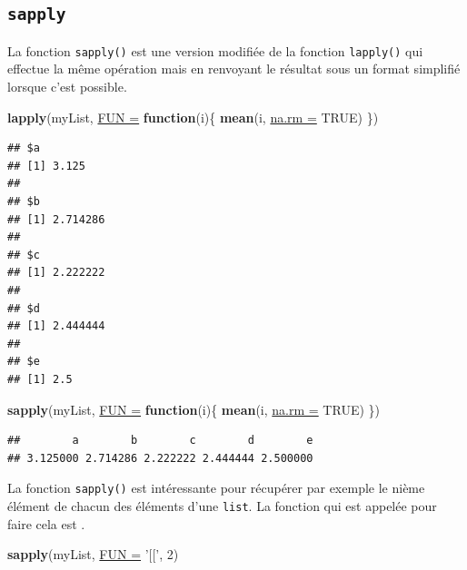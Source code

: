 \documentclass[twoside,symmetric]{book}
\newenvironment{Shaded}{}{}
\newcommand{\ControlFlowTok}[1]{\textbf{#1}}
\newcommand{\DataTypeTok}[1]{\underline{#1}}
\newcommand{\DecValTok}[1]{#1}
\newcommand{\KeywordTok}[1]{\textbf{#1}}
\newcommand{\NormalTok}[1]{#1}
\newcommand{\OtherTok}[1]{#1}
\newcommand{\StringTok}[1]{#1}
\begin{document}
\hypertarget{l17lapply}{%
\subsection{\texorpdfstring{\texttt{sapply}}{sapply}}\label{l17lapply}}

La fonction \texttt{sapply()} est une version modifiée de la fonction \texttt{lapply()} qui effectue la même opération mais en renvoyant le résultat sous un format simplifié lorsque c'est possible.

\begin{Shaded}
\begin{Highlighting}[]
\KeywordTok{lapply}\NormalTok{(myList, }\DataTypeTok{FUN =} \ControlFlowTok{function}\NormalTok{(i)\{}
  \KeywordTok{mean}\NormalTok{(i, }\DataTypeTok{na.rm =} \OtherTok{TRUE}\NormalTok{)}
\NormalTok{\})}
\end{Highlighting}
\end{Shaded}

\begin{verbatim}
## $a
## [1] 3.125
## 
## $b
## [1] 2.714286
## 
## $c
## [1] 2.222222
## 
## $d
## [1] 2.444444
## 
## $e
## [1] 2.5
\end{verbatim}

\begin{Shaded}
\begin{Highlighting}[]
\KeywordTok{sapply}\NormalTok{(myList, }\DataTypeTok{FUN =} \ControlFlowTok{function}\NormalTok{(i)\{}
  \KeywordTok{mean}\NormalTok{(i, }\DataTypeTok{na.rm =} \OtherTok{TRUE}\NormalTok{)}
\NormalTok{\})}
\end{Highlighting}
\end{Shaded}

\begin{verbatim}
##        a        b        c        d        e 
## 3.125000 2.714286 2.222222 2.444444 2.500000
\end{verbatim}

La fonction \texttt{sapply()} est intéressante pour récupérer par exemple le nième élément de chacun des éléments d'une \texttt{list}. La fonction qui est appelée pour faire cela est \texttt{\textquotesingle{}{[}{[}\textquotesingle{}}.

\begin{Shaded}
\begin{Highlighting}[]
\KeywordTok{sapply}\NormalTok{(myList, }\DataTypeTok{FUN =} \StringTok{'[['}\NormalTok{, }\DecValTok{2}\NormalTok{)}
\end{Highlighting}
\end{Shaded}
\end{document}
